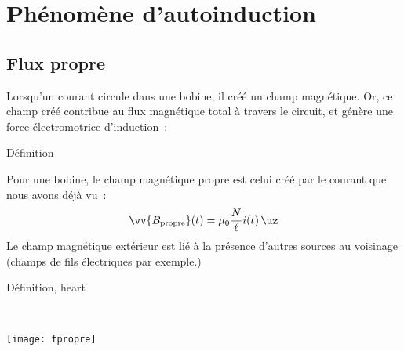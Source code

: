 \documentclass[../main/main.tex]{subfiles}
\begin{document}
\section{Phénomène d'autoinduction}
\label{sec:autoind}

\subsection{Flux propre}
\label{ssec:fpropre}
Lorsqu'un courant circule dans une bobine, il créé un champ magnétique. Or, ce
champ créé contribue au flux magnétique total à travers le circuit, et génère
une force électromotrice d'induction~:
\begin{tdefi}{Définition}
\end{tdefi}
Pour une bobine, le champ magnétique propre est celui créé par le courant que
nous avons déjà vu~:
\[
  \vv{B_{\rm propre}}(t) = \mu_0 \frac{N}{\ell }i(t)\,\uz
\]
Le champ magnétique extérieur est lié à la présence d'autres sources au
voisinage (champs de fils électriques par exemple.)

\begin{tdefi}{Définition, heart}
  \noindent
  \begin{minipage}[t]{.7\linewidth}
    \begin{center}
    \end{center}
  \end{minipage}
  \hfill
  \begin{minipage}[t]{.29\linewidth}
    ~
    \vspace*{-20pt}
    \begin{center}
      \texttt{[image: fpropre]}
      \label{fig:fpropre}
    \end{center}
  \end{minipage}
\end{tdefi}
\end{document}
